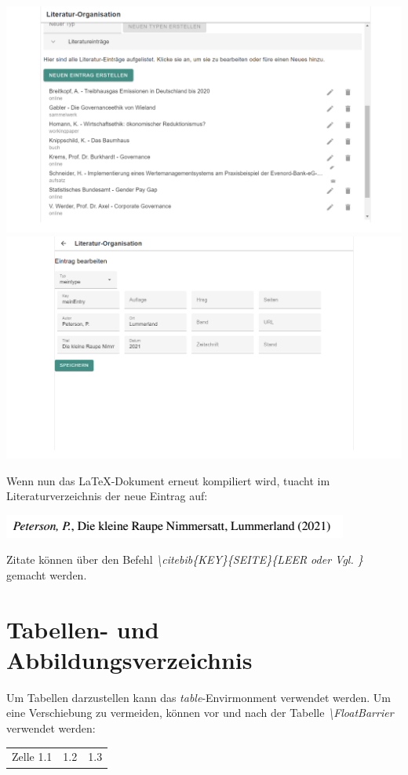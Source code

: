 \documentclass[12pt]{article}
\begin{document}
\begin{center}
\includegraphics[width=\textwidth]{dokuImages/gui2.png}
\includegraphics[width=\textwidth]{dokuImages/gui_4.png}
\end{center}
Wenn nun das LaTeX-Dokument erneut kompiliert wird, tuacht im Literaturverzeichnis der neue Eintrag auf:
\begin{center}
\includegraphics[width=\textwidth]{dokuImages/litentry.png}
\end{center}
Zitate können über den Befehl \textit{\textbackslash citebib\{KEY\}\{SEITE\}\{LEER oder Vgl. \}} gemacht werden.

\section{Tabellen- und Abbildungsverzeichnis}
Um Tabellen darzustellen kann das \textit{table}-Envirmonment verwendet werden. Um eine Verschiebung zu vermeiden, können vor und nach der Tabelle \textit{\textbackslash FloatBarrier} verwendet werden:
\FloatBarrier
\begin{table}[!ht]
\begin{tabular}{|p{3cm}|l|l|}
Zelle 1.1 & 1.2 & 1.3\\
\end{tabular}
\end{table}
\FloatBarrier
\end{document}
